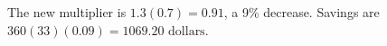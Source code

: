 The new multiplier is $1.3(0.7)=0.91$, a 9\% decrease. Savings are $360(33)(0.09)=\boxed{1069.20\text{ dollars}}$.
